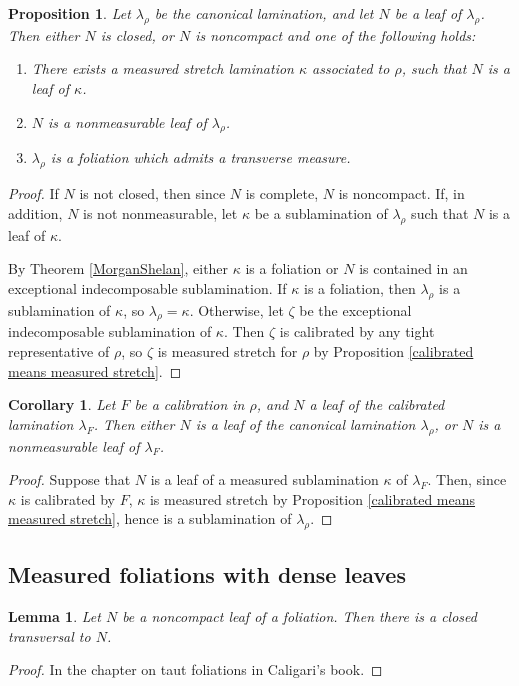 \documentclass[reqno,11pt]{amsart}
\newtheorem{lemma}[theorem]{Lemma}
\newtheorem{proposition}[theorem]{Proposition}
\newtheorem{corollary}[theorem]{Corollary}
\theoremstyle{definition}
\numberwithin{equation}{section}
\begin{document}
\begin{proposition}\label{classification of leaves}
Let $\lambda_\rho$ be the canonical lamination, and let $N$ be a leaf of $\lambda_\rho$.
Then either $N$ is closed, or $N$ is noncompact and one of the following holds:
\begin{enumerate}
\item There exists a measured stretch lamination $\kappa$ associated to $\rho$, such that $N$ is a leaf of $\kappa$.
\item $N$ is a nonmeasurable leaf of $\lambda_\rho$.
\item $\lambda_\rho$ is a foliation which admits a transverse measure.
\end{enumerate}
\end{proposition}
\begin{proof}
If $N$ is not closed, then since $N$ is complete, $N$ is noncompact.
If, in addition, $N$ is not nonmeasurable, let $\kappa$ be a sublamination of $\lambda_\rho$ such that $N$ is a leaf of $\kappa$.

By Theorem \ref{MorganShelan}, either $\kappa$ is a foliation or $N$ is contained in an exceptional indecomposable sublamination.
If $\kappa$ is a foliation, then $\lambda_\rho$ is a sublamination of $\kappa$, so $\lambda_\rho = \kappa$.
Otherwise, let $\zeta$ be the exceptional indecomposable sublamination of $\kappa$.
Then $\zeta$ is calibrated by any tight representative of $\rho$, so $\zeta$ is measured stretch for $\rho$ by Proposition \ref{calibrated means measured stretch}.
\end{proof}

\begin{corollary}
Let $F$ be a calibration in $\rho$, and $N$ a leaf of the calibrated lamination $\lambda_F$.
Then either $N$ is a leaf of the canonical lamination $\lambda_\rho$, or $N$ is a nonmeasurable leaf of $\lambda_F$.
\end{corollary}
\begin{proof}
Suppose that $N$ is a leaf of a measured sublamination $\kappa$ of $\lambda_F$.
Then, since $\kappa$ is calibrated by $F$, $\kappa$ is measured stretch by Proposition \ref{calibrated means measured stretch}, hence is a sublamination of $\lambda_\rho$.
\end{proof}

\subsection{Measured foliations with dense leaves}
\begin{lemma}\label{noncompact leaf implies transversal}
Let $N$ be a noncompact leaf of a foliation.
Then there is a closed transversal to $N$.
\end{lemma}
\begin{proof}
In the chapter on taut foliations in Caligari's book.
\end{proof}
\end{document}
